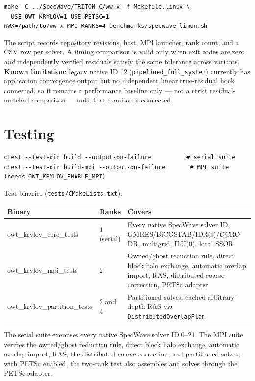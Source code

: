 \documentclass[11pt,a4paper]{report}
\begin{document}
\begin{lstlisting}[style=bashstyle]
make -C ../SpecWave/TRITON-C/ww-x -f Makefile.linux \
  USE_OWT_KRYLOV=1 USE_PETSC=1
WWX=/path/to/ww-x MPI_RANKS=4 benchmarks/specwave_limon.sh
\end{lstlisting}

The script records repository revisions, host, MPI launcher, rank
count, and a CSV row per solver. A timing comparison is valid only
when exit codes are zero \emph{and} independently verified residuals
satisfy the same tolerance across variants. \textbf{Known limitation}:
legacy native ID 12 (\lstinline!pipelined_full_system!) currently has
application convergence output but no independent linear
true-residual hook connected, so it remains a performance baseline
only --- not a strict residual-matched comparison --- until that
monitor is connected.

\chapter{Testing}
\label{sec:13}

\begin{lstlisting}[style=bashstyle]
ctest --test-dir build --output-on-failure          # serial suite
ctest --test-dir build-mpi --output-on-failure       # MPI suite (needs OWT_KRYLOV_ENABLE_MPI)
\end{lstlisting}

Test binaries (\texttt{tests/CMakeLists.txt}):

\begin{longtable}{L{0.26\textwidth}C{0.14\textwidth}P{0.46\textwidth}}
\toprule
Binary & Ranks & Covers \\
\midrule
\endhead
owt\_krylov\_core\_tests & 1 (serial) & Every native SpecWave solver ID, GMRES/BiCGSTAB/IDR(s)/GCRO-DR, multigrid, ILU(0), local SSOR \\
owt\_krylov\_mpi\_tests & 2 & Owned/ghost reduction rule, direct block halo exchange, automatic overlap import, RAS, distributed coarse correction, PETSc adapter \\
owt\_krylov\_partition\_tests & 2 and 4 & Partitioned solves, cached arbitrary-depth RAS via \lstinline!DistributedOverlapPlan! \\
\bottomrule
\end{longtable}

The serial suite exercises every native SpecWave solver ID 0--21. The
MPI suite verifies the owned/ghost reduction rule, direct block halo
exchange, automatic overlap import, RAS, the distributed coarse
correction, and partitioned solves; with PETSc enabled, the two-rank
test also assembles and solves through the PETSc adapter.
\end{document}

